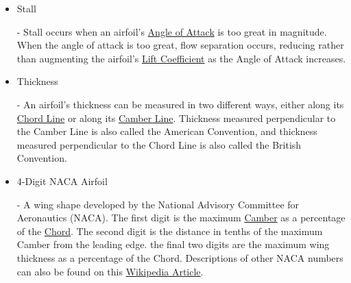 \documentclass{article}
\begin{document}
\begin{itemize}
	\item \hypertarget{ST}{Stall} - Stall occurs when an airfoil's \hyperlink{alpha}{Angle of Attack} is too great in magnitude. When the angle of attack is too great, flow separation occurs, reducing rather than augmenting the airfoil's \hyperlink{CL}{Lift Coefficient} as the Angle of Attack increases.
	
	\item \hypertarget{Th}{Thickness} - An airfoil's thickness can be measured in two different ways, either along its \hyperlink{c}{Chord Line} or along its \hyperlink{Camber}{Camber Line}. Thickness measured perpendicular to the Camber Line is also called the American Convention, and thickness measured perpendicular to the Chord Line is also called the British Convention.
		
	\item \hypertarget{NACA}{4-Digit NACA Airfoil} - A wing shape developed by the National Advisory Committee for Aeronautics (NACA). The first digit is the maximum \hyperlink{Camber}{Camber} as a percentage of the \hyperlink{c}{Chord}. The second digit is the distance in tenths of the maximum Camber from the leading edge. the final two digits are the maximum wing thickness as a percentage of the Chord. Descriptions of other NACA numbers can also be found on this \href{https://en.wikipedia.org/wiki/NACA_airfoil}{Wikipedia Article}. 
	
\end{itemize}
\end{document}

